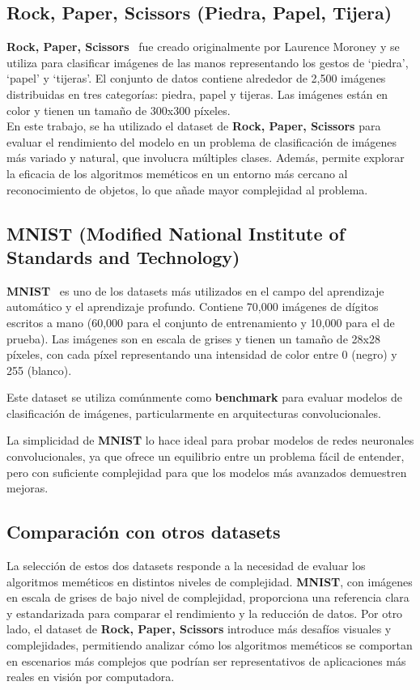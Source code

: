 \subsection{Rock, Paper, Scissors (Piedra, Papel, Tijera)}\label{subsec:rock-paper-scissors}
\textbf{Rock, Paper, Scissors}~\cite{Rock Paper Scissors Dataset} fue creado originalmente por Laurence Moroney y se
utiliza para clasificar imágenes de las manos representando los gestos de `piedra', `papel' y `tijeras'.
El conjunto de datos contiene alrededor de 2,500 imágenes distribuidas en tres categorías: piedra, papel y tijeras.
Las imágenes están en color y tienen un tamaño de 300x300 píxeles. \\[6pt]

En este trabajo, se ha utilizado el dataset de \textbf{Rock, Paper, Scissors} para evaluar el rendimiento del modelo en
un problema de clasificación de imágenes más variado y natural, que involucra múltiples clases.
Además, permite explorar la eficacia de los algoritmos meméticos en un entorno más cercano al reconocimiento de
objetos, lo que añade mayor complejidad al problema.

\subsection{MNIST (Modified National Institute of Standards and Technology)}\label{subsec:mnist}
\textbf{MNIST}~\cite{MNIST Dataset} es uno de los datasets más utilizados en el campo del aprendizaje automático y el
aprendizaje profundo.
Contiene 70,000 imágenes de dígitos escritos a mano (60,000 para el conjunto de entrenamiento y 10,000 para el de
prueba).
Las imágenes son en escala de grises y tienen un tamaño de 28x28 píxeles, con cada píxel representando una intensidad
de color entre 0 (negro) y 255 (blanco).

Este dataset se utiliza comúnmente como \textbf{benchmark} para evaluar modelos de clasificación de imágenes,
particularmente en arquitecturas convolucionales.

La simplicidad de \textbf{MNIST} lo hace ideal para probar modelos de redes neuronales convolucionales, ya que ofrece un
equilibrio entre un problema fácil de entender, pero con suficiente complejidad para que los modelos más avanzados
demuestren mejoras.

\subsection{Comparación con otros datasets}\label{subsec:comparacion-con-otros-datasets}
La selección de estos dos datasets responde a la necesidad de evaluar los algoritmos meméticos en distintos niveles de
complejidad.
\textbf{MNIST}, con imágenes en escala de grises de bajo nivel de complejidad, proporciona una referencia clara y
estandarizada para comparar el rendimiento y la reducción de datos.
Por otro lado, el dataset de \textbf{Rock, Paper, Scissors} introduce más desafíos visuales y complejidades,
permitiendo analizar cómo los algoritmos meméticos se comportan en escenarios más complejos que podrían ser
representativos de aplicaciones más reales en visión por computadora.

